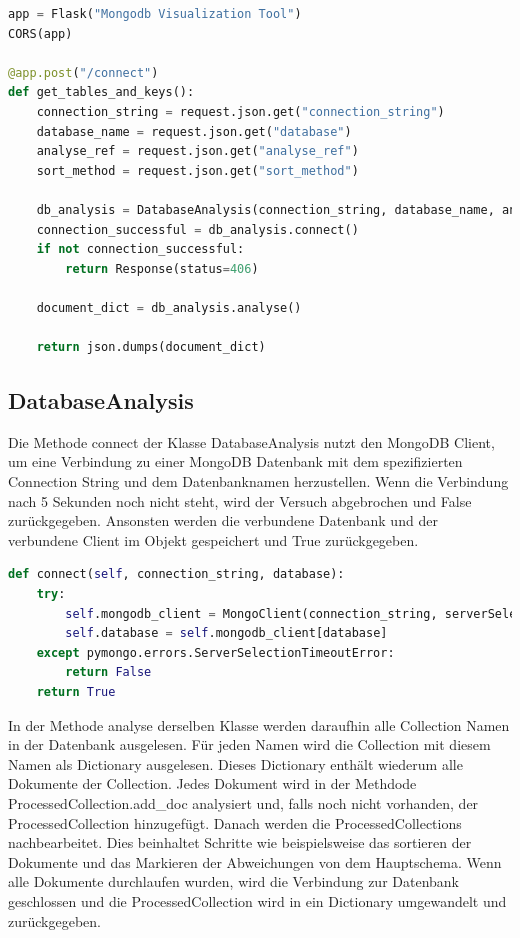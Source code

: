 \begin{lstlisting}[language=python, caption={app.py},label={lst:backend_app}]
app = Flask("Mongodb Visualization Tool")
CORS(app)

@app.post("/connect")
def get_tables_and_keys():
    connection_string = request.json.get("connection_string")
    database_name = request.json.get("database")
    analyse_ref = request.json.get("analyse_ref")
    sort_method = request.json.get("sort_method")

    db_analysis = DatabaseAnalysis(connection_string, database_name, analyse_ref, sort_method)
    connection_successful = db_analysis.connect()
    if not connection_successful:
        return Response(status=406)

    document_dict = db_analysis.analyse()

    return json.dumps(document_dict)
\end{lstlisting}

\subsection{DatabaseAnalysis}
\label{sub:ba_database_analysis}

Die Methode connect der Klasse DatabaseAnalysis nutzt  den MongoDB Client, um eine Verbindung zu einer MongoDB Datenbank mit dem spezifizierten Connection String und dem Datenbanknamen herzustellen.
Wenn die Verbindung nach 5 Sekunden noch nicht steht, wird der Versuch abgebrochen und False zurückgegeben.
Ansonsten werden die verbundene Datenbank und der verbundene Client im Objekt gespeichert und True zurückgegeben.

\begin{lstlisting}[language=python, caption={DatabaseAnalysis.connect},label={lst:backend_connect}]
def connect(self, connection_string, database):
    try:
        self.mongodb_client = MongoClient(connection_string, serverSelectionTimeoutMS=5000)
        self.database = self.mongodb_client[database]
    except pymongo.errors.ServerSelectionTimeoutError:
        return False
    return True
\end{lstlisting}

In der Methode analyse derselben Klasse werden daraufhin alle Collection Namen in der Datenbank ausgelesen.
Für jeden Namen wird die Collection mit diesem Namen als Dictionary ausgelesen.
Dieses Dictionary enthält wiederum alle Dokumente der Collection.
Jedes Dokument wird in der Methdode ProcessedCollection.add\_doc analysiert und, falls noch nicht vorhanden, der ProcessedCollection hinzugefügt.
Danach werden die ProcessedCollections nachbearbeitet.
Dies beinhaltet Schritte wie beispielsweise das sortieren der Dokumente und das Markieren der Abweichungen von dem Hauptschema.
Wenn alle Dokumente durchlaufen wurden, wird die Verbindung zur Datenbank geschlossen und die ProcessedCollection wird in ein Dictionary umgewandelt und zurückgegeben.

